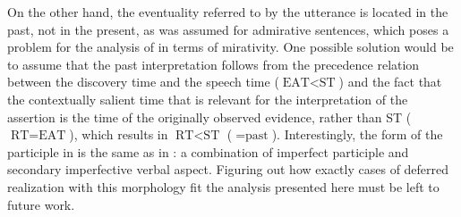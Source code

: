 \documentclass[output=paper,
colorlinks,
citecolor=brown,
newtxmath
]{langscibook}
\begin{document}
On the other hand, the eventuality referred to by the utterance is located in the past, not in the present, as was assumed for admirative sentences, which poses a problem for the analysis of  in terms of mirativity.
One possible solution would be to assume that the past interpretation follows from the precedence relation between the discovery time and the speech time ($\text{EAT}<\text{ST}$) and the fact that the contextually salient time that is relevant for the interpretation of the assertion is the time of the originally observed evidence, rather than ST ($\text{RT}=\text{EAT}$), which results in $\text{RT}<\text{ST}$ (${}=\text{past}$).
Interestingly, the form of the participle in  is the same as in : a combination of imperfect participle and secondary imperfective verbal aspect. Figuring out how exactly cases of deferred realization with this morphology fit the analysis presented here must be left to future work.






\end{document}
